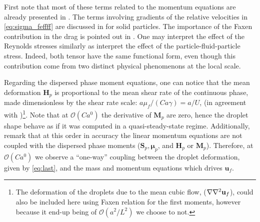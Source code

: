 First note that most of these terms related to the momentum equations are already presented in \citet[Appendix A]{zhang1997momentum}. 
The terms involving gradients of the relative velocities in \ref{eq:sigma_feffff} are discussed in \citet{nozieres1987local} for solid particles.  
The importance of the Faxen contribution in the drag is pointed out in \citet{Lhuillier_2009}. 
One may interpret the effect of the Reynolds stresses similarly as \citep{zhang2021ensemble,wang2021numerical} interpret the effect of the particle-fluid-particle stress. 
Indeed, both tensor have the same functional form, even though this contribution come from two distinct physical phenomenons at the local scale. 
 
Regarding the dispersed phase moment equations, one can notice that the mean deformation $\textbf{H}_p$ is proportional to the mean shear rate of the continuous phase, made dimensionless by the shear rate scale: $a \mu_f /(Ca \gamma)= a/U$, (in agreement with \citet{leal2007advanced})\footnote{The deformation of the droplets due to the mean cubic flow, ($\mathbf{\nabla}\mathbf{\nabla}^2\textbf{u}_f$), could also be included here using Faxen relation for the first moments, however because it end-up being of $\mathcal{O}(a^2/L^2)$ we choose to not. }.  
Note that at $\mathcal{O}(Ca^0)$ the derivative of $\textbf{M}_p$ are zero, hence the droplet shape behave as if it was computed in a quasi-steady-state regime.
Additionally, remark that at this order in accuracy the linear momentum equations are not coupled with the dispersed phase moments ($\textbf{S}_p,\bm\mu_p$, and $\textbf{H}_p$ or $\textbf{M}_p$).  
Therefore, at $\mathcal{O}(Ca^0)$ we observe a ``one-way'' coupling between the droplet deformation, given by \ref{eq:last}, and the mass and momentum equations which drives $\textbf{u}_f$. 


